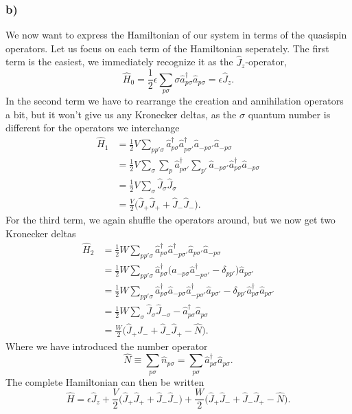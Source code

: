 \documentclass[a4paper, 11pt, notitlepage, english]{article}
\newcommand{\op}[1]{\hat{#1}}
\newcommand{\eps}{\epsilon}
\begin{document}
\clearpage

\subsubsection*{b)}
We now want to express the Hamiltonian of our system in terms of the quasispin operators. Let us focus on each term of the Hamiltonian seperately. The first term is the easiest, we immediately recognize it as the $\op{J}_z$-operator,
$$\op{H}_0 = \frac{1}{2}\eps \sum_{p\sigma} \sigma \op{a}_{p\sigma}^\dagger \op{a}_{p\sigma} = \eps\op{J}_z.$$
In the second term we have to rearrange the creation and annihilation operators a bit, but it won't give us any Kronecker deltas, as the $\sigma$ quantum number is different for the operators we interchange 
\begin{align*}
\op{H}_1 &= 
\frac{1}{2}V\sum_{pp'\sigma} \op{a}_{p\sigma}^\dagger \op{a}_{p\sigma'}^\dagger \op{a}_{-p\sigma'} \op{a}_{-p\sigma} \\
&= \frac{1}{2}V\sum_{\sigma} \sum_p\op{a}_{p\sigma'}^\dagger \sum_{p'}\op{a}_{-p\sigma'} \op{a}_{p\sigma}^\dagger \op{a}_{-p\sigma} \\
&= \frac{1}{2}V\sum_{\sigma} \op{J}_{\sigma}\op{J}_{\sigma} \\
&= \frac{V}{2}\big(\op{J}_{+}\op{J}_{+} + \op{J}_{-}\op{J}_{-}\big).
\end{align*}
For the third term, we again shuffle the operators around, but we now get two Kronecker deltas
\begin{align*}
\op{H}_2&= \frac{1}{2}W\sum_{pp'\sigma} \op{a}_{p\sigma}^\dagger \op{a}_{-p\sigma'}^\dagger \op{a}_{p\sigma'} \op{a}_{-p\sigma} \\
&= \frac{1}{2}W\sum_{pp'\sigma}  \op{a}_{p\sigma}^\dagger \big(\op{a}_{-p\sigma} \op{a}_{-p\sigma'}^\dagger - \delta_{pp'}\big)\op{a}_{p\sigma'} \\
&= \frac{1}{2}W\sum_{pp'\sigma}  \op{a}_{p\sigma}^\dagger \op{a}_{-p\sigma} \op{a}_{-p\sigma'}^\dagger \op{a}_{p\sigma'} - \delta_{pp'}\op{a}_{p\sigma}^\dagger \op{a}_{p\sigma'} \\
&= \frac{1}{2}W\sum_{\sigma} \op{J}_\sigma\op{J}_{-\sigma} - \op{a}_{p\sigma}^\dagger \op{a}_{p\sigma} \\
&= \frac{W}{2}\big(\op{J}_+\op{J}_- + \op{J}_-\op{J}_{+} - \op{N}\big).
\end{align*}
Where we have introduced the number operator
$$\op{N} \equiv \sum_{p\sigma} \op{n}_{p\sigma} = \sum_{p\sigma}\op{a}_{p\sigma}^\dagger \op{a}_{p\sigma}.$$
The complete Hamiltonian can then be written
$$\op{H} = \eps\op{J}_z + \frac{V}{2}\big(\op{J}_+\op{J}_+ + \op{J}_-\op{J}_-\big) + \frac{W}{2}\big(\op{J}_+\op{J}_- + \op{J}_-\op{J}_+ - \op{N}\big).$$
\end{document}
